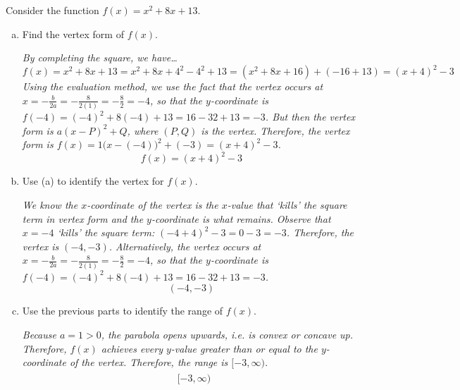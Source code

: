 \documentclass[12pt,letterpaper]{exam}
\begin{document}
\begin{questions}
\newpage
{} \par\vspace{0.3cm}

Consider the function $f(x)= x^2 + 8x + 13$.
	\begin{enumerate}[(a)]
	\item Find the vertex form of $f(x)$. \pspace
	
	{\itshape By completing the square, we have\dots
		\[
		f(x)= x^2 + 8x + 13= x^2 + 8x + 4^2 - 4^2 + 13= (x^2 + 8x + 16) + (-16 + 13)= (x + 4)^2 - 3
		\]
	Using the evaluation method, we use the fact that the vertex occurs at $x= -\frac{b}{2a}= -\frac{8}{2(1)}= -\frac{8}{2}= -4$, so that the $y$-coordinate is $f(-4)= (-4)^2 + 8(-4) + 13= 16 - 32 + 13= -3$. But then the vertex form is $a(x - P)^2 + Q$, where $(P, Q)$ is the vertex. Therefore, the vertex form is $f(x)= 1\big(x - (-4) \big)^2 + (-3)= (x + 4)^2 - 3$.
		\[
		\boxed{f(x)= (x + 4)^2 - 3}
		\]
	} 
	
	\item Use (a) to identify the vertex for $f(x)$. \pspace
	
	{\itshape We know the $x$-coordinate of the vertex is the $x$-value that `kills' the square term in vertex form and the $y$-coordinate is what remains. Observe that $x= -4$ `kills' the square term: $(-4 + 4)^2 - 3= 0 - 3= -3$. Therefore, the vertex is $(-4, -3)$. Alternatively, the vertex occurs at $x= -\frac{b}{2a}= -\frac{8}{2(1)}= -\frac{8}{2}= -4$, so that the $y$-coordinate is $f(-4)= (-4)^2 + 8(-4) + 13= 16 - 32 + 13= -3$.
	\[
	\boxed{(-4, -3)}	
	\]
	} \pvspace{1.4cm}
	
	\item Use the previous parts to identify the range of $f(x)$. \pspace
	
	{\itshape Because $a= 1 > 0$, the parabola opens upwards, i.e. is convex or concave up. Therefore, $f(x)$ achieves every $y$-value greater than or equal to the $y$-coordinate of the vertex. Therefore, the range is $[-3, \infty)$. 
		\[
		\boxed{\phantom{2_{2_1}^{2^1}} [-3, \infty)^{\phantom{2^1}}}
		\]
	}
	\end{enumerate}



\newpage
{} \par\vspace{0.3cm}


\end{questions}
\end{document}
